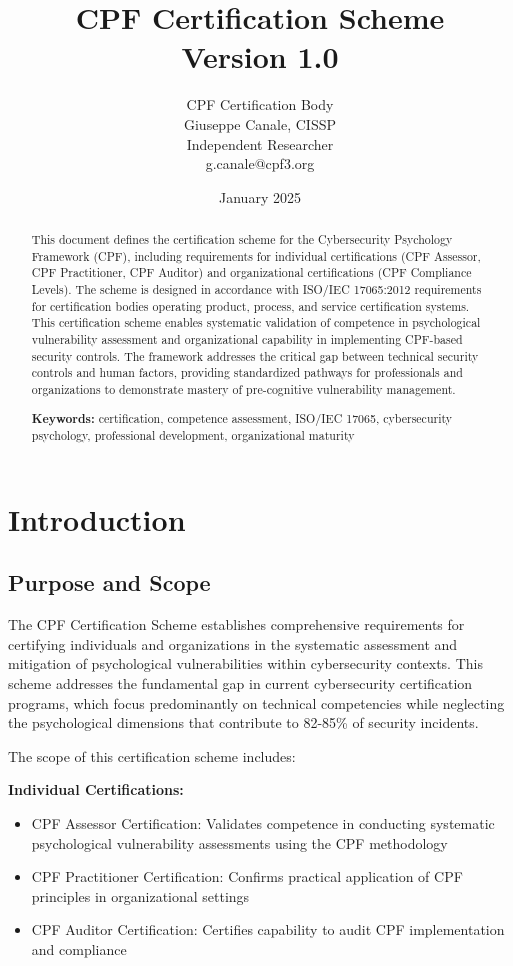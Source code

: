 \documentclass[11pt,a4paper]{article}
\title{\textbf{CPF Certification Scheme}\\
\large Version 1.0}
\author{CPF Certification Body\\
Giuseppe Canale, CISSP\\
\small Independent Researcher\\
\small g.canale@cpf3.org}
\date{January 2025}
\begin{document}
\maketitle

\begin{abstract}
This document defines the certification scheme for the Cybersecurity Psychology Framework (CPF), including requirements for individual certifications (CPF Assessor, CPF Practitioner, CPF Auditor) and organizational certifications (CPF Compliance Levels). The scheme is designed in accordance with ISO/IEC 17065:2012 requirements for certification bodies operating product, process, and service certification systems. This certification scheme enables systematic validation of competence in psychological vulnerability assessment and organizational capability in implementing CPF-based security controls. The framework addresses the critical gap between technical security controls and human factors, providing standardized pathways for professionals and organizations to demonstrate mastery of pre-cognitive vulnerability management.

\textbf{Keywords:} certification, competence assessment, ISO/IEC 17065, cybersecurity psychology, professional development, organizational maturity
\end{abstract}

\tableofcontents
\newpage

\section{Introduction}

\subsection{Purpose and Scope}

The CPF Certification Scheme establishes comprehensive requirements for certifying individuals and organizations in the systematic assessment and mitigation of psychological vulnerabilities within cybersecurity contexts. This scheme addresses the fundamental gap in current cybersecurity certification programs, which focus predominantly on technical competencies while neglecting the psychological dimensions that contribute to 82-85\% of security incidents.

The scope of this certification scheme includes:

\textbf{Individual Certifications:}
\begin{itemize}
\item CPF Assessor Certification: Validates competence in conducting systematic psychological vulnerability assessments using the CPF methodology
\item CPF Practitioner Certification: Confirms practical application of CPF principles in organizational settings
\item CPF Auditor Certification: Certifies capability to audit CPF implementation and compliance
\end{itemize}
\end{document}
